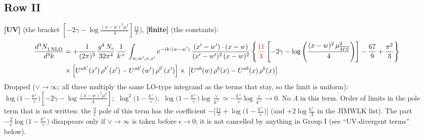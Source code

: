 \documentclass[9pt]{article}
\numberwithin{equation}{section}
\begin{document}
\subsection{Row II}
\textbf{[UV]} (the bracket $\left[-2\gamma-\log\frac{(x-w)^{2}\mu^{2}}{4}\right]\frac{11}{3}$), \textbf{[finite]} (the constants):
\begin{align}
     \frac{d^{3}N_{1\,\rm NLO}^{\rm}}{d^{3}k} &  =  +\frac{1}{(2\pi)^{3}}\, \frac{g^{4}\,N_{c}}{32\pi^{4}}\,\frac{1}{k^{+}}\, \int_{w, w',x,x'} e^{-ik\cdot(w-w^\prime)}\, \frac{(x'-w')\cdot (x-w)}{(x'-w')^{2}\, (x-w)^{2}}\, \Bigg\{ {\color{red}\frac{11}{3}}\left[-2\gamma-\log{\left(\frac{(x-w)^{2}\,\mu^{2}_{\overline{MS}}}{4}\right)}\right]-\frac{67}{9}+\frac{\pi^{2}}{3}\Bigg\}\notag \\ & \times\left[U^{ab'}(x')\,\rho^{b'}(x') - U^{ab'}(w')\,\rho^{b'}(x')\right]\times\,\left[U^{ab}(w)\,\rho^{b}(x) - U^{ab}(x)\,\rho^{b}(x)\right]
\end{align}
{\color{orange}Dropped ($\vee\to\infty$; all three multiply the same LO-type integrand as the terms that stay, so the limit is uniform): $\log\big(1-\frac{k^{+}}{\vee}\big)\left[-2\gamma-\log\frac{(x-w)^{2}\mu^{2}}{4}\right]$; $\ \log^{2}\big(1-\frac{k^{+}}{\vee}\big)$; $\ \log\big(1-\frac{k^{+}}{\vee}\big)\log\frac{\vee}{k^{+}}\simeq-\frac{k^{+}}{\vee}\log\frac{\vee}{k^{+}}\to0$.} No $\Lambda$ in this term. {\color{magenta} Order of limits in the pole term that is not written: the $\frac{2}{\epsilon}$ pole of this term has the coefficient $-\big[\frac{11}{3}+\log\big(1-\frac{k^{+}}{\vee}\big)\big]$ (and $+2\log\frac{k^{+}}{\Lambda}$ in the JIMWLK list). The part $-\frac{2}{\epsilon}\log\big(1-\frac{k^{+}}{\vee}\big)$ disappears only if $\vee\to\infty$ is taken before $\epsilon\to0$; it is not cancelled by anything in Group I (see ``UV-divergent terms'' below).}
\end{document}
